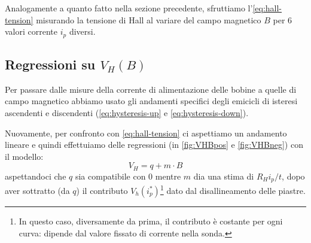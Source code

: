 
Analogamente a quanto fatto nella sezione precedente, sfruttiamo l'\cref{eq:hall-tension} misurando la tensione di Hall al variare del campo magnetico $ B $ per $ 6 $ valori corrente $ i_p $ diversi.

\subsection{Regressioni su $ V_H(B) $}

Per passare dalle misure della corrente di alimentazione delle bobine a quelle di campo magnetico abbiamo usato gli andamenti specifici degli emicicli di isteresi ascendenti e discendenti (\cref{eq:hysteresis-up} e \cref{eq:hysteresis-down}).

Nuovamente, per confronto con \cref{eq:hall-tension} ci aspettiamo un andamento lineare e quindi effettuiamo delle regressioni (in \cref{fig:VHBpos} e \cref{fig:VHBneg}) con il modello:
\begin{equation}
V_H = q + m \cdot B
\end{equation}
aspettandoci che $ q $ sia compatibile con $ 0 $ mentre $ m $ dia una stima di $ R_H i_p / t $, dopo aver sottratto (da $ q $) il contributo $ V_h(i_p^*) $\footnote{In questo caso, diversamente da prima, il contributo è costante per ogni curva: dipende dal valore fissato di corrente nella sonda.} dato dal disallineamento delle piastre.

